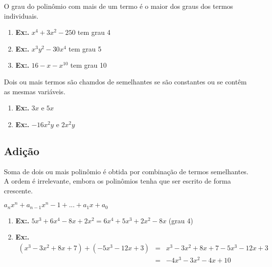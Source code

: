 \begin{flushleft}
    O grau do polinômio com mais de um termo é o maior dos graus dos termos individuais. 

    \begin{enumerate}
      \item \textbf{Ex:.} $ x^4 + 3x^2 - 250 $ tem grau 4

      \item \textbf{Ex:.} $ x^3y^2 - 30x^4 $ tem grau 5

      \item \textbf{Ex:.} $ 16 - x - x^10 $ tem grau 10

    \end{enumerate}

    Dois ou mais termos são chamdos de semelhantes se são constantes ou se contêm as mesmas variáveis.

    \begin{enumerate}

      \item \textbf{Ex:.} $ 3x $ e $ 5x $ 
      
      \item \textbf{Ex:.} $ -16x^2y $ e $ 2x^2y $

    \end{enumerate}

    \subsection{Adição}

    Soma de dois ou mais polinômio é obtida por combinação de termos semelhantes. A ordem é irrelevante, embora os polinômios tenha que ser escrito de forma crescente. 

    \begin{center}
      \begin{math}
        a_{n}x^n + a_{n -1}x^n-1 + ... + a_{1}x + a_{0} 
      \end{math}
    \end{center}

    \begin{enumerate}
      \item \textbf{Ex:.} $ 5x^3 + 6x^4 - 8x + 2x^2 = 6x^4 + 5x^3 + 2x^2 - 8x $ (grau 4)

      \item \textbf{Ex:.}
        \begin{eqnarray}
          (x^3-3x^2+8x+7)+(-5x^3-12x+3) & = & x^3-3x^2+8x+7-5x^3-12x+3  \nonumber \\
          & = & -4x^3-3x^2-4x+10 \nonumber
        \end{eqnarray}

    \end{enumerate}

\end{flushleft}
